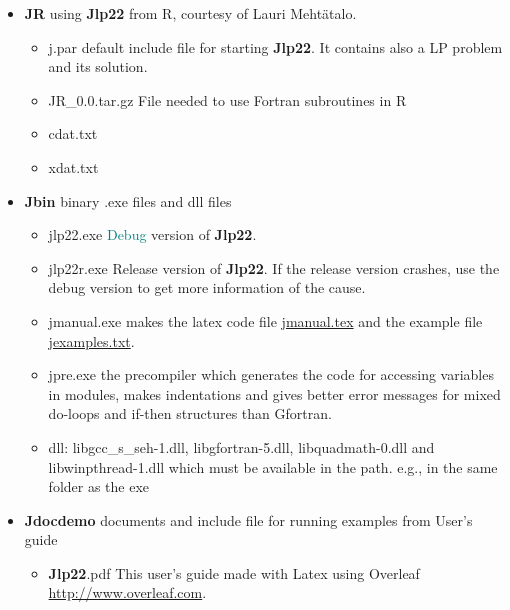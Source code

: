 \begin{itemize} 
 
 
\item \textbf{JR}  \hspace{0.2cm} using \textbf{Jlp22} from R, courtesy of Lauri Meht\"atalo. 
 
\begin{itemize} 
\item j.par \hspace{0.2cm}default include file for starting \textbf{Jlp22}. It contains also a LP 
problem and its solution. 
\item JR\_0.0.tar.gz \hspace{0.2cm} File needed to use Fortran subroutines in R 
\item cdat.txt 
\item xdat.txt 
\end{itemize} 
 
\item \textbf{Jbin}\hspace{0.2cm} binary .exe files and dll files 
\begin{itemize} 
\item jlp22.exe \hspace{0.2cm} \textcolor{teal}{Debug} version of \textbf{Jlp22}. 
\item jlp22r.exe \hspace{0.2cm} Release version of \textbf{Jlp22}. If the release version crashes, 
use the debug version to get more information of the cause. 
\item jmanual.exe \hspace{0.2cm} makes the latex code file  \href{run:./jmanual.tex}{jmanual.tex} and 
the example file \href{run:./jexamples.txt}{jexamples.txt}. 
\item jpre.exe \hspace{0.2cm} the precompiler which generates the code 
for accessing variables in modules, makes indentations and gives better error messages 
for mixed do-loops and if-then structures than Gfortran. 
\item dll:\hspace{0.2cm} libgcc\_s\_seh-1.dll, libgfortran-5.dll, libquadmath-0.dll and 
libwinpthread-1.dll which must be available in the path. e.g., in the same folder as the exe 
\end{itemize} 
 
\item \textbf{Jdocdemo} \hspace{0.2cm}documents and include file for running examples from User's guide 
\begin{itemize} 
\item \textbf{Jlp22}.pdf \hspace{0.2cm} This user's guide made with Latex using Overleaf \url{http://www.overleaf.com}. 
 

\end{itemize}
\end{itemize}
